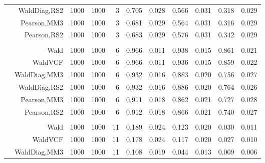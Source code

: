 \documentclass[
]{article}
\begin{document}
\begin{table}[H]
{\begin{tabular}[t]{lrrrrrrrlrr}
\hspace{1em} & WaldDiag,RS2 & 1000 & 1000 & 3 & 0.705 & 0.028 & 0.566 & 0.031 & 0.318 & 0.029\\

\hspace{1em} & Pearson,MM3 & 1000 & 1000 & 3 & 0.681 & 0.029 & 0.564 & 0.031 & 0.316 & 0.029\\

\hspace{1em} & Pearson,RS2 & 1000 & 1000 & 3 & 0.683 & 0.029 & 0.576 & 0.031 & 0.342 & 0.029\\
\cmidrule{1-11}
\addlinespace[0.3em]
\multicolumn{11}{l}{\textbf{1F 15V}}\\
\hspace{1em} & Wald & 1000 & 1000 & 6 & 0.966 & 0.011 & 0.938 & 0.015 & 0.861 & 0.021\\

\hspace{1em} & WaldVCF & 1000 & 1000 & 6 & 0.966 & 0.011 & 0.936 & 0.015 & 0.859 & 0.022\\

\hspace{1em} & WaldDiag,MM3 & 1000 & 1000 & 6 & 0.932 & 0.016 & 0.883 & 0.020 & 0.756 & 0.027\\

\hspace{1em} & WaldDiag,RS2 & 1000 & 1000 & 6 & 0.932 & 0.016 & 0.886 & 0.020 & 0.764 & 0.026\\

\hspace{1em} & Pearson,MM3 & 1000 & 1000 & 6 & 0.911 & 0.018 & 0.862 & 0.021 & 0.727 & 0.028\\

\hspace{1em} & Pearson,RS2 & 1000 & 1000 & 6 & 0.912 & 0.018 & 0.866 & 0.021 & 0.740 & 0.027\\
\cmidrule{1-11}
\addlinespace[0.3em]
\multicolumn{11}{l}{\textbf{2F 10V}}\\
\hspace{1em} & Wald & 1000 & 1000 & 11 & 0.189 & 0.024 & 0.123 & 0.020 & 0.030 & 0.011\\

\hspace{1em} & WaldVCF & 1000 & 1000 & 11 & 0.178 & 0.024 & 0.117 & 0.020 & 0.027 & 0.010\\

\hspace{1em} & WaldDiag,MM3 & 1000 & 1000 & 11 & 0.108 & 0.019 & 0.044 & 0.013 & 0.009 & 0.006\\


\end{tabular}}
\end{table}
\end{document}
